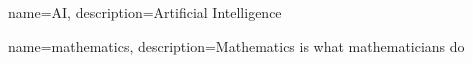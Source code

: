 
{
    name=AI,
    description={Artificial Intelligence}
}
 
{
    name=mathematics,
    description={Mathematics is what mathematicians do}
}


\glsaddall
\clearpage
\printglossary[title=Special Terms, toctitle=List of terms]
